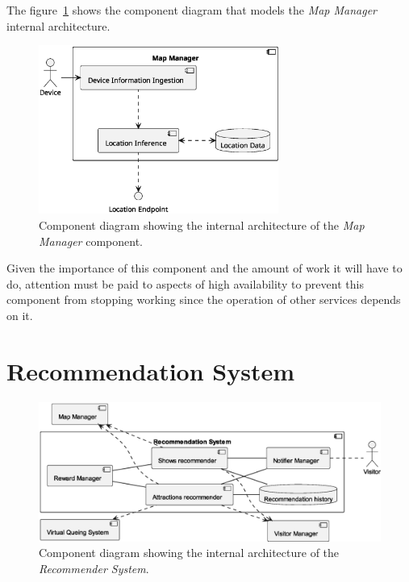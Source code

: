 The figure~\ref{fig:map-manager} shows the component diagram that models the \textit{Map Manager} internal architecture.

\begin{figure}[H]
	\centering
	\includegraphics[width=0.7\textwidth]{img/map-manager-overview.eps}
	\caption{Component diagram showing the internal architecture of the \textit{Map Manager} component.}
	\label{fig:map-manager}
\end{figure}

Given the importance of this component and the amount of work it will have to do, attention must be paid to aspects of high availability to prevent
this component from stopping working since the operation of other services depends on it.

\section{Recommendation System}

\begin{figure}[H]
	\centering
	\includegraphics[width=\textwidth]{img/recommender.eps}
	\caption{Component diagram showing the internal architecture of the \textit{Recommender System}.
	}
	\label{fig:recommender-arch}
\end{figure}

